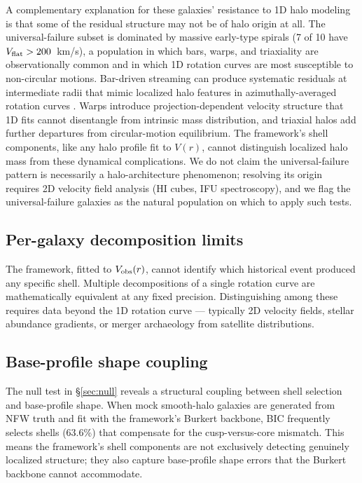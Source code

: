 A complementary explanation for these galaxies' resistance to 1D halo modeling is that some of the residual structure may not be of halo origin at all. The universal-failure subset is dominated by massive early-type spirals (7 of 10 have $V_{\rm flat} > 200$~km/s), a population in which bars, warps, and triaxiality are observationally common and in which 1D rotation curves are most susceptible to non-circular motions. Bar-driven streaming can produce systematic residuals at intermediate radii that mimic localized halo features in azimuthally-averaged rotation curves \citep[e.g.,][]{SellwoodWilkinson1993,Sellwood2014}. Warps introduce projection-dependent velocity structure that 1D fits cannot disentangle from intrinsic mass distribution, and triaxial halos add further departures from circular-motion equilibrium. The framework's shell components, like any halo profile fit to $V(r)$, cannot distinguish localized halo mass from these dynamical complications. We do not claim the universal-failure pattern is necessarily a halo-architecture phenomenon; resolving its origin requires 2D velocity field analysis (HI cubes, IFU spectroscopy), and we flag the universal-failure galaxies as the natural population on which to apply such tests.

\subsection{Per-galaxy decomposition limits}

The framework, fitted to $V_{\rm obs}(r)$, cannot identify which historical event produced any specific shell. Multiple decompositions of a single rotation curve are mathematically equivalent at any fixed precision. Distinguishing among these requires data beyond the 1D rotation curve --- typically 2D velocity fields, stellar abundance gradients, or merger archaeology from satellite distributions.

\subsection{Base-profile shape coupling}
\label{sec:base-profile}

The null test in \S\ref{sec:null} reveals a structural coupling between shell selection and base-profile shape. When mock smooth-halo galaxies are generated from NFW truth and fit with the framework's Burkert backbone, BIC frequently selects shells (63.6\%) that compensate for the cusp-versus-core mismatch. This means the framework's shell components are not exclusively detecting genuinely localized structure; they also capture base-profile shape errors that the Burkert backbone cannot accommodate.

